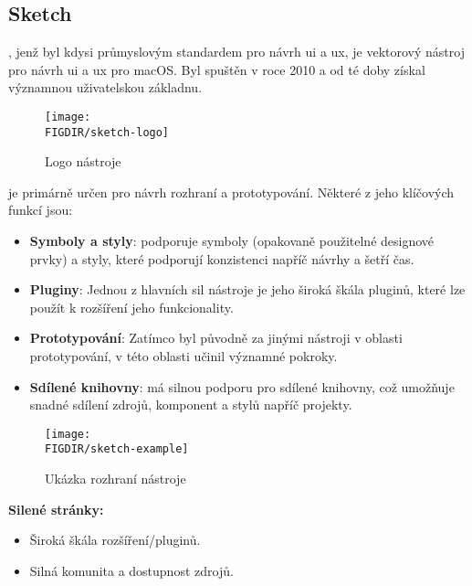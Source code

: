 \subsection{Sketch}
\label{subsec:navrh-ui-nastroje-sketch}
, jenž byl kdysi průmyslovým standardem pro návrh \ac{ui} a \ac{ux}, je vektorový nástroj pro návrh \ac{ui} a \ac{ux} pro macOS\@.
Byl spuštěn v roce 2010 a od té doby získal významnou uživatelskou základnu.

\begin{figure}[H]
    \centering
    \texttt{[image: \\FIGDIR/sketch-logo]}
    \caption{Logo nástroje \cite{sketch}}
    \label{fig:sketch-logo}
\end{figure}

 je primárně určen pro návrh rozhraní a prototypování.
Některé z jeho klíčových funkcí jsou:
\begin{itemize}
    \item \textbf{Symboly a styly}:  podporuje symboly (opakovaně použitelné designové prvky) a styly, které podporují konzistenci napříč návrhy a šetří čas.
    \item \textbf{Pluginy}: Jednou z hlavních sil nástroje  je jeho široká škála pluginů, které lze použít k rozšíření jeho funkcionality.
    \item \textbf{Prototypování}: Zatímco  byl původně za jinými nástroji v oblasti prototypování, v této oblasti učinil významné pokroky.
    \item \textbf{Sdílené knihovny}:  má silnou podporu pro sdílené knihovny, což umožňuje snadné sdílení zdrojů, komponent a stylů napříč projekty.
\end{itemize}

\begin{figure}[H]
    \centering
    \texttt{[image: \\FIGDIR/sketch-example]}
    \caption{Ukázka rozhraní nástroje \cite{sketch}}
    \label{fig:sketch-example}
\end{figure}

\textbf{Silené stránky:}
\begin{itemize}
    \item Široká škála rozšíření/pluginů.
    \item Silná komunita a dostupnost zdrojů.
\end{itemize}

